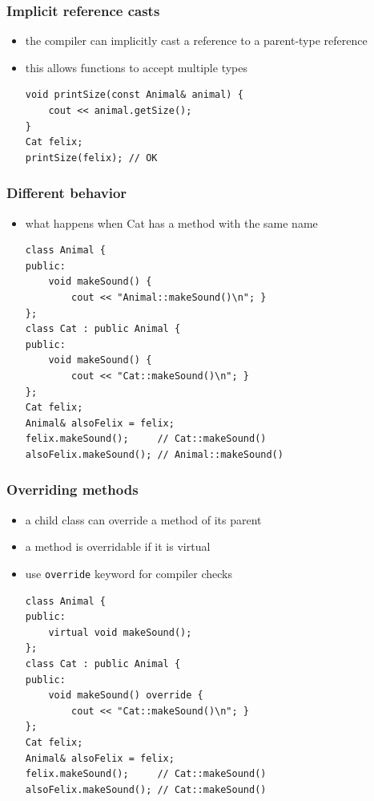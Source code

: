 \begin{frame}[fragile]
    \frametitle{Implicit reference casts}
    \begin{itemize}
    \item the compiler can implicitly cast a reference to a parent-type reference
    \item this allows functions to accept multiple types
    \begin{lstlisting}[numbers=none]
void printSize(const Animal& animal) {
    cout << animal.getSize();
}
Cat felix;
printSize(felix); // OK
    \end{lstlisting}
    \end{itemize}
\end{frame}

\begin{frame}[fragile]
    \frametitle{Different behavior}
    \begin{itemize}
    \item what happens when Cat has a method with the same name
    \begin{lstlisting}[numbers=none]
class Animal {
public:
    void makeSound() { 
        cout << "Animal::makeSound()\n"; }
};
class Cat : public Animal {
public:
    void makeSound() {
        cout << "Cat::makeSound()\n"; }
};
Cat felix;
Animal& alsoFelix = felix;
felix.makeSound();     // Cat::makeSound()
alsoFelix.makeSound(); // Animal::makeSound()
    \end{lstlisting}
    \end{itemize}
\end{frame}

\begin{frame}[fragile]
    \frametitle{Overriding methods}
    \begin{itemize}
    \item a child class can override a method of its parent
    \item a method is overridable if it is virtual
    \item use \lstinline{override} keyword for compiler checks
    \begin{lstlisting}[numbers=none]
class Animal {
public:
    virtual void makeSound();
};
class Cat : public Animal {
public:
    void makeSound() override {
        cout << "Cat::makeSound()\n"; }
};
Cat felix;
Animal& alsoFelix = felix;
felix.makeSound();     // Cat::makeSound()
alsoFelix.makeSound(); // Cat::makeSound()
    \end{lstlisting}
    \end{itemize}
\end{frame}

